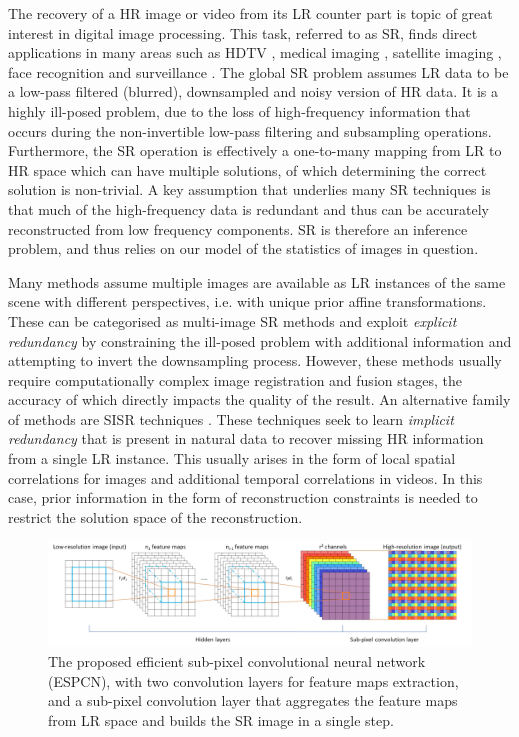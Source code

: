 \documentclass[10pt,twocolumn,letterpaper]{article}
\begin{document}
The recovery of a \ac{HR} image or video from its \ac{LR} counter part is topic of great interest in digital image processing. This task, referred to as \ac{SR}, finds direct applications in many areas such as HDTV \cite{Goto2014}, medical imaging \cite{Peled2001,shi2013cardiac}, satellite imaging \cite{Thornton2006}, face recognition \cite{Gunturk2003} and surveillance \cite{Zhang2010a}. The global \ac{SR} problem assumes \ac{LR} data to be a low-pass filtered (blurred), downsampled and noisy version of \ac{HR} data. It is a highly ill-posed problem, due to the loss of high-frequency information that occurs during the non-invertible low-pass filtering and subsampling operations. Furthermore, the SR operation is effectively a one-to-many mapping from \ac{LR} to \ac{HR} space which can have multiple solutions, of which determining the correct solution is non-trivial. A key assumption that underlies many \ac{SR} techniques is that much of the high-frequency data is redundant and thus can be accurately reconstructed from low frequency components. \ac{SR} is therefore an inference problem, and thus relies on our model of the statistics of images in question.

Many methods assume multiple images are available as \ac{LR} instances of the same scene with different perspectives, i.e. with unique prior affine transformations. These can be categorised as multi-image \ac{SR} methods \cite{Borman1998a, Farsiu2004} and exploit \emph{explicit redundancy} by constraining the ill-posed problem with additional information and attempting to invert the downsampling process. However, these methods usually require computationally complex image registration and fusion stages, the accuracy of which directly impacts the quality of the result. An alternative family of methods are \ac{SISR} techniques \cite{yang2014single}. These techniques seek to learn \emph{implicit redundancy} that is present in natural data to recover missing \ac{HR} information from a single \ac{LR} instance. This usually arises in the form of local spatial correlations for images and additional temporal correlations in videos. In this case, prior information in the form of reconstruction constraints is needed to restrict the solution space of the reconstruction.

\begin{figure}[htbp]
\begin{center}
\includegraphics[width=1.0\linewidth]{figures//networkstructure.jpg}
\caption{The proposed efficient sub-pixel convolutional neural network (ESPCN), with two convolution layers for feature maps extraction, and a sub-pixel convolution layer that aggregates the feature maps from \ac{LR} space and builds the \ac{SR} image in a single step.}
\label{fig:networkstructure}
\end{center}
\end{figure}
\end{document}
